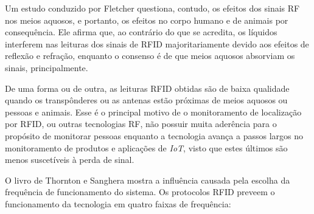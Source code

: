  Um estudo conduzido por Fletcher \cite{fletcher2005study} questiona, contudo, os efeitos dos sinais RF nos meios aquosos, e portanto, os efeitos no corpo humano e de animais por consequência. Ele afirma que, ao contrário do que se acredita, os líquidos interferem nas leituras dos sinais de RFID majoritariamente devido aos efeitos de reflexão e refração, enquanto o consenso é de que meios aquosos absorviam os sinais, principalmente.
 
 De uma forma ou de outra, as leituras RFID obtidas são de baixa qualidade quando os transpônderes ou as antenas estão próximas de meios aquosos ou pessoas e animais. Esse é o principal motivo de o monitoramento de localização por RFID, ou outras tecnologias RF, não possuir muita aderência para o propósito de monitorar pessoas enquanto a tecnologia avança a passos largos no monitoramento de produtos e aplicações de \textit{IoT}, visto que estes últimos são menos suscetíveis à perda de sinal.
 
 O livro de Thornton e Sanghera \cite{thornton2011cheat} mostra a influência causada pela escolha da frequência de funcionamento do sistema. Os protocolos RFID preveem o funcionamento da tecnologia em quatro faixas de frequência:
 

